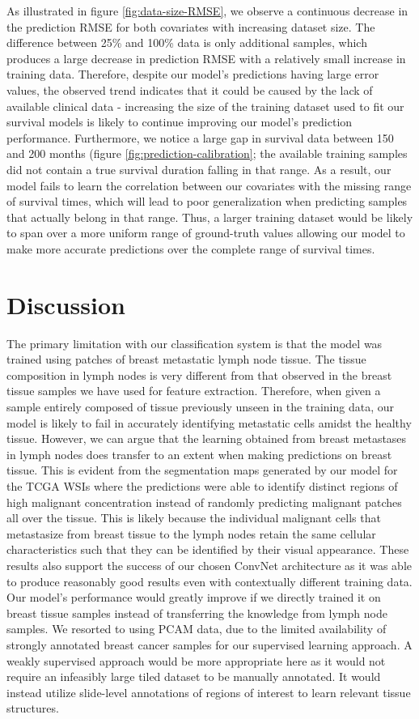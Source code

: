\documentclass{l4proj}
\begin{document}
As illustrated in figure \ref{fig:data-size-RMSE}, we observe a continuous decrease in the prediction RMSE for both covariates with increasing dataset size. The difference between 25\% and 100\% data is only additional samples, which produces a large decrease in prediction RMSE with a relatively small increase in training data. Therefore, despite our model's predictions having large error values, the observed trend indicates that it could be caused by the lack of available clinical data - increasing the size of the training dataset used to fit our survival models is likely to continue improving our model's prediction performance. Furthermore, we notice a large gap in survival data between 150 and 200 months (figure \ref{fig:prediction-calibration}; the available training samples did not contain a true survival duration falling in that range. As a result, our model fails to learn the correlation between our covariates with the missing range of survival times, which will lead to poor generalization when predicting samples that actually belong in that range. Thus, a larger training dataset would be likely to span over a more uniform range of ground-truth values allowing our model to make more accurate predictions over the complete range of survival times. 

\section{Discussion}
The primary limitation with our classification system is that the model was trained using patches of breast metastatic lymph node tissue. The tissue composition in lymph nodes is very different from that observed in the breast tissue samples we have used for feature extraction. Therefore, when given a sample entirely composed of tissue previously unseen in the training data, our model is likely to fail in accurately identifying metastatic cells amidst the healthy tissue. However, we can argue that the learning obtained from breast metastases in lymph nodes does transfer to an extent when making predictions on breast tissue. This is evident from the segmentation maps generated by our model for the TCGA WSIs where the predictions were able to identify distinct regions of high malignant concentration instead of randomly predicting malignant patches all over the tissue. This is likely because the individual malignant cells that metastasize from breast tissue to the lymph nodes retain the same cellular characteristics such that they can be identified by their visual appearance. These results also support the success of our chosen ConvNet architecture as it was able to produce reasonably good results even with contextually different training data. Our model's performance would greatly improve if we directly trained it on breast tissue samples instead of transferring the knowledge from lymph node samples. We resorted to using PCAM data, due to the limited availability of strongly annotated breast cancer samples for our supervised learning approach. A weakly supervised approach would be more appropriate here as it would not require an infeasibly large tiled dataset to be manually annotated. It would instead utilize slide-level annotations of regions of interest to learn relevant tissue structures. 
\end{document}
